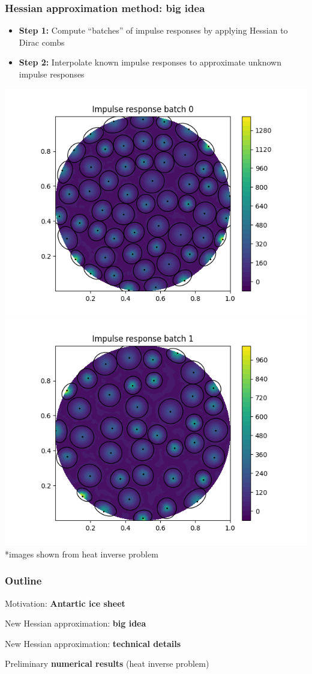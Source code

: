 \documentclass[10pt,final,xcolor=dvipsnames]{beamer}
\begin{document}
\begin{frame}
  \frametitle{Hessian approximation method: big idea}
      \begin{itemize}
      \item {\bf Step 1:} Compute ``batches'' of impulse responses by applying Hessian to Dirac combs
      \item {\bf Step 2:} Interpolate known impulse responses to approximate unknown impulse responses
      \end{itemize}
  	\includegraphics[width=0.45\columnwidth]{IRB1.png}  \includegraphics[width=0.45\columnwidth]{IRB2.png}
  *images shown from heat inverse problem
\end{frame}
\begin{frame}
	\frametitle{Outline}
	{\Large
		\begin{itemize}
			\setlength\itemsep{2em}
			{\color{lightgray}\item Motivation: \textbf{Antartic ice sheet}}
			{\color{lightgray}\item New Hessian approximation: \textbf{big idea}}
			\item New Hessian approximation: \textbf{technical details}
			{\color{lightgray}\item Preliminary \textbf{numerical results} (heat inverse problem)}
		\end{itemize}
	}
\end{frame}
\end{document}
